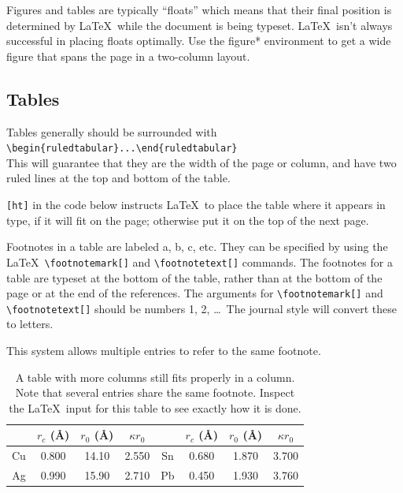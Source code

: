\documentclass[reprint]{JASA}
\begin{document}
 Figures and tables are typically ``floats'' which means that their
final position is determined by \LaTeX\ while the document is being
typeset. \LaTeX\ isn't always successful in placing floats
optimally.  Use the figure* environment to get a wide figure that spans the 
page in a two-column layout.

\subsection{\label{subsec:3:2} Tables}
Tables generally should be surrounded with
\verb+\begin{ruledtabular}...\end{ruledtabular}+\\
This will guarantee that they are the width of the
page or column, and have two ruled lines at the top
and bottom of the table.

\verb+[ht]+ in the code below instructs \LaTeX\ to place the table
where it appears in type, if it will fit on the page;
otherwise put it on the top of the next page.

Footnotes in a table are labeled a, b, c,
 etc.  They can
be  specified  by  using  the  \LaTeX\
\verb+\footnotemark[]+
and
\verb+\footnotetext[]+ commands.
The  footnotes  for  a  table  are  typeset  at  the
bottom  of  the  table,  rather  than  at  the  bottom  of  the
page or at the end of the references.  The arguments for
\verb+\footnotemark[]+
and
\verb+\footnotetext[]+
should be numbers
1, 2, \ldots\  The journal style will convert these to letters.

This system allows
multiple entries to refer to the same
footnote.   


\begin{table}[ht]
\caption{\label{tab:table1}A table with more columns still fits
properly in a column. Note that several entries share the same
footnote. Inspect the \LaTeX\ input for this table to see
exactly how it is done.}

\begin{ruledtabular}
\begin{tabular}{cccccccc}
 &$r_c$ (\AA)\footnotemark[1]&$r_0$ (\AA)&$\kappa r_0$&
 &$r_c$ (\AA) &$r_0$ (\AA)&$\kappa r_0$\\
\hline
Cu& 0.800 & 14.10 & 2.550 &Sn\footnotemark[1]
& 0.680 & 1.870 & 3.700 \\
Ag& 0.990 & 15.90 & 2.710 &Pb\footnotemark[2]
& 0.450 & 1.930 & 3.760 \\
\end{tabular}
\end{ruledtabular}
\end{table}
\clearpage
\end{document}
